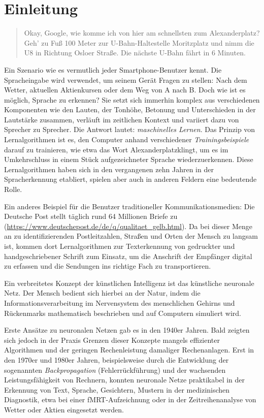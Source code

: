 \section{Einleitung}
\begin{quote}
\glqq Okay, Google, wie komme ich von hier am schnellsten zum Alexanderplatz? \grqq\\

\glqq Geh' zu Fuß 100 Meter zur U-Bahn-Haltestelle Moritzplatz und nimm die U8 in Richtung Osloer Straße. Die nächste U-Bahn fährt in 6 Minuten.\grqq
\end{quote}

Ein Szenario wie es vermutlich jeder Smartphone-Benutzer kennt. Die Spracheingabe wird verwendet, um seinem Gerät Fragen zu stellen: Nach dem Wetter, aktuellen Aktienkursen oder dem Weg von A nach B. Doch wie ist es möglich, Sprache zu erkennen? Sie setzt sich immerhin komplex aus verschiedenen Komponenten wie den Lauten, der Tonhöhe, Betonung und Unterschieden in der Lautstärke zusammen, verläuft im zeitlichen Kontext und variiert dazu von Sprecher zu Sprecher. Die Antwort lautet: \emph{maschinelles Lernen}. Das Prinzip von Lernalgorithmen ist es, den Computer anhand verschiedener \emph{Trainingsbeispiele} darauf zu trainieren, wie etwa das Wort \glqq Alexanderplatz\grqq klingt, um es im Umkehrschluss in einem Stück aufgezeichneter Sprache wiederzuerkennen. Diese Lernalgorithmen haben sich in den vergangenen zehn Jahren in der Spracherkennung etabliert, spielen aber auch in anderen Feldern eine bedeutende Rolle.

Ein anderes Beispiel für die Benutzer traditioneller Kommunikationsmedien: Die Deutsche Post stellt täglich rund 64 Millionen Briefe zu (\url{https://www.deutschepost.de/de/q/qualitaet_gelb.html}). Da bei dieser Menge an zu identifizierenden Postleitzahlen, Straßen und Orten der Mensch zu langsam ist, kommen dort Lernalgorithmen zur Texterkennung von gedruckter und handgeschriebener Schrift zum Einsatz, um die Anschrift der Empfänger digital zu erfassen und die Sendungen ins richtige Fach zu transportieren.

Ein verbreitetes Konzept der künstlichen Intelligenz ist das künstliche neuronale Netz. Der Mensch bedient sich hierbei an der Natur, indem die Informationsverarbeitung im Nervensystem des menschlichen Gehirns und Rückenmarks mathematisch beschrieben und auf Computern simuliert wird.

Erste Ansätze zu neuronalen Netzen gab es in den 1940er Jahren. Bald zeigten sich jedoch in der Praxis Grenzen dieser Konzepte mangels effizienter Algorithmen und der geringen Rechenleistung damaliger Rechenanlagen. Erst in den 1970er und 1980er Jahren, beispielsweise durch die Entwicklung der sogenannten \emph{Backpropagation} (Fehlerrückführung) und der wachsenden Leistungsfähigkeit von Rechnern, konnten neuronale Netze praktikabel in der Erkennung von Text, Sprache, Gesichtern, Mustern in der medizinischen Diagnostik, etwa bei einer fMRT-Aufzeichnung oder in der Zeitreihenanalyse von Wetter oder Aktien eingesetzt werden.

